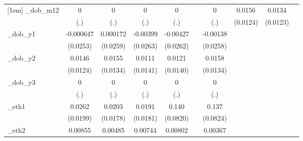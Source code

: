 \begin{table}[htbp]
\begin{tabular}{l*{9}{c}}
[1em]
\_dob\_m12    &           0         &           0         &           0         &           0         &                     &           0         &      0.0156         &      0.0134         &                     \\
            &         (.)         &         (.)         &         (.)         &         (.)         &                     &         (.)         &    (0.0124)         &    (0.0123)         &                     \\
[1em]
\_dob\_y1     &   -0.000647         &    0.000172         &    -0.00399         &    -0.00427         &                     &    -0.00138         &                     &                     &                     \\
            &    (0.0253)         &    (0.0259)         &    (0.0263)         &    (0.0262)         &                     &    (0.0258)         &                     &                     &                     \\
[1em]
\_dob\_y2     &      0.0146         &      0.0155         &      0.0111         &      0.0121         &                     &      0.0158         &                     &                     &                     \\
            &    (0.0124)         &    (0.0134)         &    (0.0141)         &    (0.0140)         &                     &    (0.0134)         &                     &                     &                     \\
[1em]
\_dob\_y3     &           0         &           0         &           0         &           0         &                     &           0         &                     &                     &                     \\
            &         (.)         &         (.)         &         (.)         &         (.)         &                     &         (.)         &                     &                     &                     \\
[1em]
\_eth1       &      0.0262         &      0.0203         &      0.0191         &       0.140\sym{*}  &                     &       0.137\sym{*}  &                     &                     &                     \\
            &    (0.0199)         &    (0.0178)         &    (0.0181)         &    (0.0820)         &                     &    (0.0824)         &                     &                     &                     \\
[1em]
\_eth2       &     0.00855         &     0.00485         &     0.00744         &     0.00802         &                     &     0.00367         &                     &                     &                     \\

\end{tabular}
\end{table}
